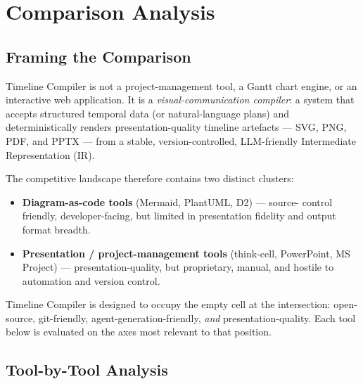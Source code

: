 
\section{Comparison Analysis}
\label{sec:comparison}

\subsection{Framing the Comparison}

Timeline Compiler is not a project-management tool, a Gantt chart engine,
or an interactive web application.
It is a \emph{visual-communication compiler}: a system that accepts structured
temporal data (or natural-language plans) and deterministically renders
presentation-quality timeline artefacts --- SVG, PNG, PDF, and PPTX --- from
a stable, version-controlled, LLM-friendly Intermediate Representation (IR).

The competitive landscape therefore contains two distinct clusters:

\begin{itemize}
  \item \textbf{Diagram-as-code tools} (Mermaid, PlantUML, D2) --- source-
        control friendly, developer-facing, but limited in presentation fidelity
        and output format breadth.
  \item \textbf{Presentation / project-management tools} (think-cell,
        PowerPoint, MS Project) --- presentation-quality, but proprietary,
        manual, and hostile to automation and version control.
\end{itemize}

\noindent
Timeline Compiler is designed to occupy the empty cell at the intersection:
open-source, git-friendly, agent-generation-friendly, \emph{and}
presentation-quality.
Each tool below is evaluated on the axes most relevant to that position.

\subsection{Tool-by-Tool Analysis}

